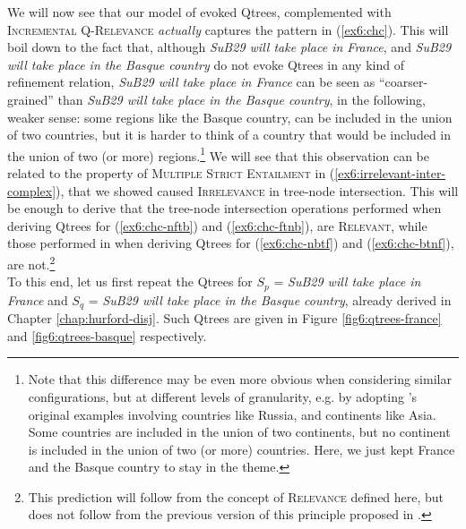 We will now see that our model of evoked Qtrees, complemented with \textsc{Incremental Q-Relevance} \textit{actually} captures the pattern in (\ref{ex6:chc}). This will boil down to the fact that, although \textit{SuB29 will take place in France}, and \textit{SuB29 will take place in the Basque country} do not evoke Qtrees in any kind of refinement relation, \textit{SuB29 will take place in France} can be seen as ``coarser-grained'' than \textit{SuB29 will take place in the Basque country}, in the following, weaker sense: some regions like the Basque country, can be included in the union of two countries, but it is harder to think of a country that would be included in the union of two (or more) regions.\footnote{Note that this difference may be even more obvious when considering similar configurations, but at different levels of granularity, e.g. by adopting \citeauthor{Singh2008a}'s original examples involving countries like Russia, and continents like Asia. Some countries are included in the union of two continents, but no continent is included in the union of two (or more) countries. Here, we just kept France and the Basque country to stay in the theme.} We will see that this observation can be related to the property of \textsc{Multiple Strict Entailment} in (\ref{ex6:irrelevant-inter-complex}), that we showed caused \textsc{Irrelevance} in tree-node intersection. This will be enough to derive that the tree-node intersection operations performed when deriving Qtrees for (\ref{ex6:chc-nftb}) and (\ref{ex6:chc-ftnb}), are \textsc{Relevant}, while those performed in when deriving Qtrees for (\ref{ex6:chc-nbtf}) and (\ref{ex6:chc-btnf}), are not.\footnote{This prediction will follow from the concept of \textsc{Relevance} defined here, but does not follow from the previous version of this principle proposed in \citet{HenotMortier2024a}.}\\

To this end, let us first repeat the Qtrees for $S_p$ = \textit{SuB29 will take place in France} and $S_q$ = \textit{SuB29 will take place in the Basque country}, already derived in Chapter \ref{chap:hurford-disj}. Such Qtrees are given in Figure \ref{fig6:qtrees-france} and \ref{fig6:qtrees-basque}  respectively.



